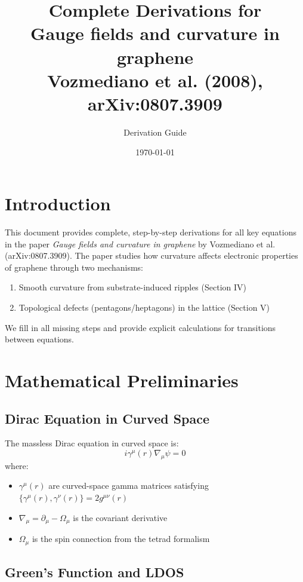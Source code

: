 \documentclass[12pt]{article}
\title{Complete Derivations for \\ \textbf{Gauge fields and curvature in graphene} \\ Vozmediano et al. (2008), arXiv:0807.3909}
\author{Derivation Guide}
\date{\today}
\begin{document}
\maketitle

\tableofcontents

\section{Introduction}

This document provides complete, step-by-step derivations for all key equations in the paper \textit{Gauge fields and curvature in graphene} by Vozmediano et al. (arXiv:0807.3909). The paper studies how curvature affects electronic properties of graphene through two mechanisms:
\begin{enumerate}
    \item Smooth curvature from substrate-induced ripples (Section IV)
    \item Topological defects (pentagons/heptagons) in the lattice (Section V)
\end{enumerate}

We fill in all missing steps and provide explicit calculations for transitions between equations.

\section{Mathematical Preliminaries}

\subsection{Dirac Equation in Curved Space}

The massless Dirac equation in curved space is:
\begin{equation}
    i\gamma^\mu(r) \nabla_\mu \psi = 0
\end{equation}
where:
\begin{itemize}
    \item $\gamma^\mu(r)$ are curved-space gamma matrices satisfying $\{\gamma^\mu(r), \gamma^\nu(r)\} = 2g^{\mu\nu}(r)$
    \item $\nabla_\mu = \partial_\mu - \Omega_\mu$ is the covariant derivative
    \item $\Omega_\mu$ is the spin connection from the tetrad formalism
\end{itemize}

\subsection{Green's Function and LDOS}
\end{document}
